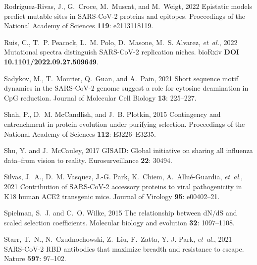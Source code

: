 \documentclass[9pt,twocolumn,twoside]{gsajnl_modified}
\begin{document}
{\begin{thebibliography}{76}
{Rodriguez-Rivas, J., G.~Croce, M.~Muscat, {\rm and} M.~Weigt}, 2022 Epistatic
  models predict mutable sites in {SARS-CoV-2} proteins and epitopes.
  Proceedings of the National Academy of Sciences {\bf 119}: e2113118119.

{Ruis, C., T.~P. Peacock, L.~M. Polo, D.~Masone, M.~S. Alvarez, {\em
  et~al.\/}}, 2022 Mutational spectra distinguish {SARS-CoV-2} replication
  niches. bioRxiv {\bf DOI 10.1101/2022.09.27.509649}.

{Sadykov, M., T.~Mourier, Q.~Guan, {\rm and} A.~Pain}, 2021 {Short sequence
  motif dynamics in the SARS-CoV-2 genome suggest a role for cytosine
  deamination in CpG reduction}. Journal of Molecular Cell Biology {\bf 13}:
  225--227.

{Shah, P., D.~M. McCandlish, {\rm and} J.~B. Plotkin}, 2015 Contingency and
  entrenchment in protein evolution under purifying selection. Proceedings of
  the National Academy of Sciences {\bf 112}: E3226--E3235.

{Shu, Y. {\rm and} J.~McCauley}, 2017 {GISAID}: Global initiative on sharing
  all influenza data--from vision to reality. Eurosurveillance {\bf 22}: 30494.

{Silvas, J.~A., D.~M. Vasquez, J.-G. Park, K.~Chiem, A.~Allu{\'e}-Guardia, {\em
  et~al.\/}}, 2021 {Contribution of SARS-CoV-2 accessory proteins to viral
  pathogenicity in K18 human ACE2 transgenic mice}. Journal of Virology {\bf
  95}: e00402--21.

{Spielman, S.~J. {\rm and} C.~O. Wilke}, 2015 The relationship between {dN/dS}
  and scaled selection coefficients. Molecular biology and evolution {\bf 32}:
  1097--1108.

{Starr, T.~N., N.~Czudnochowski, Z.~Liu, F.~Zatta, Y.-J. Park, {\em et~al.\/}},
  2021 {SARS-CoV-2 RBD} antibodies that maximize breadth and resistance to
  escape. Nature {\bf 597}: 97--102.


\end{thebibliography}}
\end{document}
